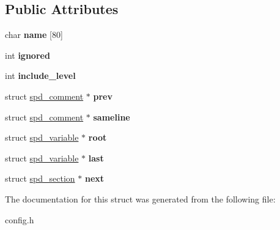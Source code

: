 \subsection*{Public Attributes}
\begin{DoxyCompactItemize}
\item 
\hypertarget{structspd__section_a52011139fe9bd4cc985257e4cc423147}{
char {\bfseries name} \mbox{[}80\mbox{]}}
\label{structspd__section_a52011139fe9bd4cc985257e4cc423147}

\item 
\hypertarget{structspd__section_af4059dce12dfc25c0cb787810c1f6408}{
int {\bfseries ignored}}
\label{structspd__section_af4059dce12dfc25c0cb787810c1f6408}

\item 
\hypertarget{structspd__section_a53098a7acb97028e1701a0f3acd9dffe}{
int {\bfseries include\_\-level}}
\label{structspd__section_a53098a7acb97028e1701a0f3acd9dffe}

\item 
\hypertarget{structspd__section_a995b8da5b1398a5a23aff9fa6c72ef09}{
struct \hyperlink{structspd__comment}{spd\_\-comment} $\ast$ {\bfseries prev}}
\label{structspd__section_a995b8da5b1398a5a23aff9fa6c72ef09}

\item 
\hypertarget{structspd__section_a5ab42fca297986730a4c41d57fa19ef6}{
struct \hyperlink{structspd__comment}{spd\_\-comment} $\ast$ {\bfseries sameline}}
\label{structspd__section_a5ab42fca297986730a4c41d57fa19ef6}

\item 
\hypertarget{structspd__section_a81790bc7a7582a40d907d4d986b0bbed}{
struct \hyperlink{structspd__variable}{spd\_\-variable} $\ast$ {\bfseries root}}
\label{structspd__section_a81790bc7a7582a40d907d4d986b0bbed}

\item 
\hypertarget{structspd__section_ad5d78ab1eeafb507d3bad5249f5765eb}{
struct \hyperlink{structspd__variable}{spd\_\-variable} $\ast$ {\bfseries last}}
\label{structspd__section_ad5d78ab1eeafb507d3bad5249f5765eb}

\item 
\hypertarget{structspd__section_a52dbe206a3e1202f91a8b841124e1796}{
struct \hyperlink{structspd__section}{spd\_\-section} $\ast$ {\bfseries next}}
\label{structspd__section_a52dbe206a3e1202f91a8b841124e1796}

\end{DoxyCompactItemize}


The documentation for this struct was generated from the following file:\begin{DoxyCompactItemize}
\item 
config.h\end{DoxyCompactItemize}
